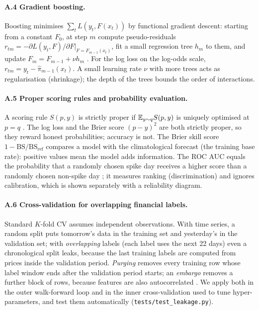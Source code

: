 \paragraph{A.4 Gradient boosting.} Boosting minimises $\sum_t L(y_t,F(x_t))$ by functional gradient
descent: starting from a constant $F_0$, at step $m$ compute pseudo-residuals
$r_{tm}=-\partial L(y_t,F)/\partial F|_{F=F_{m-1}(x_t)}$, fit a small regression tree $h_m$ to them, and update
$F_m=F_{m-1}+\nu h_m$ \citep{friedman2001}. For the log loss on the log-odds scale, $r_{tm}=y_t-\hat\pi_{m-1}(x_t)$.
A small learning rate $\nu$ with more trees acts as regularisation (shrinkage); the depth of the trees
bounds the order of interactions.

\paragraph{A.5 Proper scoring rules and probability evaluation.} A scoring rule $S(p,y)$ is strictly
proper if $\mathbb{E}_{y\sim q}S(p,y)$ is uniquely optimised at $p=q$ \citep{gneiting2007}. The log loss and the
Brier score $(p-y)^2$ are both strictly proper, so they reward honest probabilities; accuracy is not.
The Brier skill score $1-\mathrm{BS}/\mathrm{BS}_{\text{ref}}$ compares a model with the climatological
forecast (the training base rate): positive values mean the model adds information. The ROC AUC equals the
probability that a randomly chosen spike day receives a higher score than a randomly chosen non-spike day
\citep{fawcett2006}; it measures ranking (discrimination) and ignores calibration, which is shown
separately with a reliability diagram.

\paragraph{A.6 Cross-validation for overlapping financial labels.} Standard $K$-fold CV assumes
independent observations. With time series, a random split puts tomorrow's data in the training set and
yesterday's in the validation set; with \emph{overlapping} labels (each label uses the next 22 days) even a
chronological split leaks, because the last training labels are computed from prices inside the validation
period. \emph{Purging} removes every training row whose label window ends after the validation period
starts; an \emph{embargo} removes a further block of rows, because features are also autocorrelated
\citep[ch.~7]{lopezdeprado2018}. We apply both in the outer walk-forward loop and in the inner
cross-validation used to tune hyper-parameters, and test them automatically (\texttt{tests/test\_leakage.py}).

